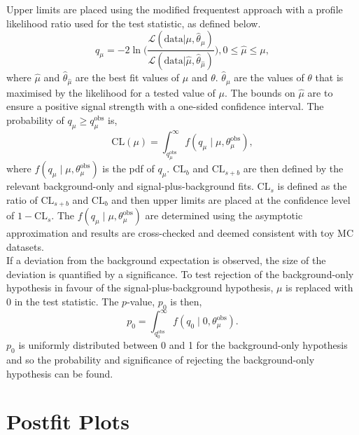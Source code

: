 Upper limits are placed using the modified frequentest approach \cite{Junk:1999kv,Read:2002hq} with a profile likelihood ratio used for the test statistic, as defined below.
\begin{equation}
  q_{\mu} = -2 \ln \Biggl(\frac{\mathcal{L}(\text{data} | \mu, \hat{\theta}_{\mu})}{\mathcal{L}(\text{data} | \hat{\mu}, \hat{\theta}_{\hat{\mu}})}\Biggl), 0 \leq \hat{\mu} \leq \mu,
\end{equation}
where $\hat{\mu}$ and $\hat{\theta}_{\hat{\mu}}$ are the best fit values of $\mu$ and $\theta$. $\hat{\theta}_{\mu}$ are the values of $\theta$ that is maximised by the likelihood for a tested value of $\mu$.
The bounds on $\hat{\mu}$ are to ensure a positive signal strength with a one-sided confidence interval.
The probability of $q_{\mu} \geq q_{\mu}^{\text{obs}}$ is,
\begin{equation}
\text{CL}(\mu) = \int^{\infty}_{q_{\mu}^{\text{obs}}} f(q_{\mu} \mid \mu, \theta_{\mu}^{\text{obs}}),
\end{equation}
where $f(q_{\mu} \mid \mu, \theta_{\mu}^{\text{obs}})$ is the pdf of $q_\mu$.
$\text{CL}_{b}$ and $\text{CL}_{s+b}$ are then defined by the relevant background-only and signal-plus-background fits.
$\text{CL}_s$ is defined as the ratio of $\text{CL}_{s+b}$ and $\text{CL}_{b}$ and then upper limits are placed at the confidence level of $1-\text{CL}_{s}$.
The $f(q_{\mu} \mid \mu, \theta_{\mu}^{\text{obs}})$ are determined using the asymptotic approximation \cite{Cowan:2010js} and results are cross-checked and deemed consistent with toy MC datasets. \\

If a deviation from the background expectation is observed, the size of the deviation is quantified by a significance.
To test rejection of the background-only hypothesis in favour of the signal-plus-background hypothesis, $\mu$ is replaced with 0 in the test statistic.
The $p$-value, $p_0$ is then,
\begin{equation}
p_{0} = \int^{\infty}_{q_{0}^{\text{obs}}} f(q_{0} \mid 0, \theta_{\mu}^{\text{obs}}).
\end{equation}
$p_{0}$ is uniformly distributed between 0 and 1 for the background-only hypothesis and so the probability and significance of rejecting the background-only hypothesis can be found. \\

\section{Postfit Plots}

